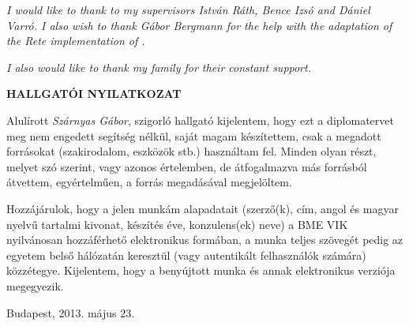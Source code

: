 \emph{I would like to thank to my supervisors István Ráth, Bence Izsó and Dániel Varró. I also wish to thank G\'abor Berg\-mann for the help with the adaptation of the Rete implementation of \eiq.}

\emph{I also would like to thank my family for their constant support.} \vfill \clearpage

\begin{center}
\large
\textbf{HALLGATÓI NYILATKOZAT}\\
\end{center}

Alulírott \emph{Szárnyas Gábor}, szigorló hallgató kijelentem, hogy ezt a diplomatervet meg nem engedett segítség nélkül, saját magam készítettem, csak a megadott forrásokat (szakirodalom, eszközök stb.) használtam fel. Minden olyan részt, melyet szó szerint, vagy azonos értelemben, de átfogalmazva más forrásból átvettem, egyértelműen, a forrás megadásával megjelöltem.

Hozzájárulok, hogy a jelen munkám alapadatait (szerző(k), cím, angol és magyar nyel\-vű tartalmi kivonat, készítés éve, konzulens(ek) neve) a BME VIK nyilvánosan hozzáférhető elektronikus formában, a munka teljes szövegét pedig az egyetem belső hálózatán keresztül (vagy autentikált felhasználók számára) közzétegye. Kijelentem, hogy a benyújtott munka és annak elektronikus verziója megegyezik.

\begin{flushleft}
\vspace*{1cm}
Budapest, 2013. május 23.
\end{flushleft}

\begin{flushright}
 \vspace*{1cm}
 \makebox[7cm]{\rule{6cm}{.4pt}}\\
 \\
\end{flushright}
\thispagestyle{empty}

\vfill
\clearpage
\thispagestyle{empty} %

